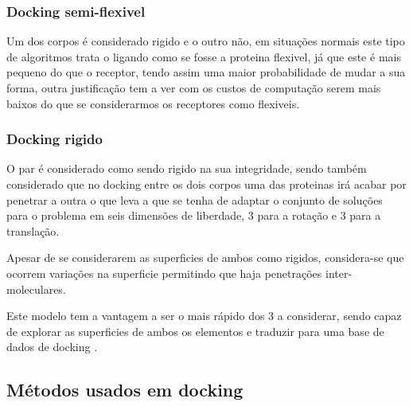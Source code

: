 	\subsubsection{Docking semi-flexivel} Um dos corpos é considerado rigido e o outro não, em situações normais este tipo de algoritmos trata o ligando como se fosse a proteina flexivel, já que este é mais pequeno do que o receptor, tendo assim uma maior probabilidade de mudar a sua forma, outra justificação tem a ver com os custos de computação serem mais baixos do que se considerarmos os receptores como flexiveis.

	\subsubsection{Docking rigido} 
	O par é considerado como sendo rigido na sua integridade, sendo também considerado que no docking entre os dois corpos uma das proteinas irá acabar por penetrar a outra o que leva a que se tenha de adaptar o conjunto de soluções para o problema em seis 		dimensões de liberdade, 3 para a rotação e 3 para a translação. %

Apesar de se considerarem as superficies de ambos como rigidos, considera-se que ocorrem variações na superficie permitindo que haja penetrações inter-moleculares.

Este modelo tem a vantagem a ser o mais rápido dos 3 a considerar, sendo capaz de explorar as superficies de ambos os elementos e traduzir para uma base de dados de docking \cite{halperin}.

\subsection{Métodos usados em docking}
